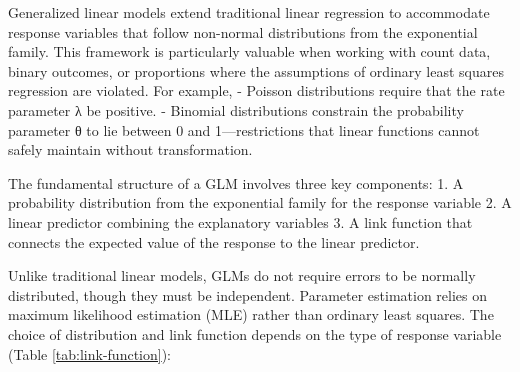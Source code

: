 \documentclass[
]{book}
\begin{document}
Generalized linear models extend traditional linear regression to accommodate response variables that follow non-normal distributions from the exponential family. This framework is particularly valuable when working with count data, binary outcomes, or proportions where the assumptions of ordinary least squares regression are violated. For example, - Poisson distributions require that the rate parameter λ be positive. - Binomial distributions constrain the probability parameter θ to lie between 0 and 1---restrictions that linear functions cannot safely maintain without transformation.

The fundamental structure of a GLM involves three key components: 1. A probability distribution from the exponential family for the response variable 2. A linear predictor combining the explanatory variables 3. A link function that connects the expected value of the response to the linear predictor.

Unlike traditional linear models, GLMs do not require errors to be normally distributed, though they must be independent. Parameter estimation relies on maximum likelihood estimation (MLE) rather than ordinary least squares. The choice of distribution and link function depends on the type of response variable (Table \ref{tab:link-function}):
\end{document}
